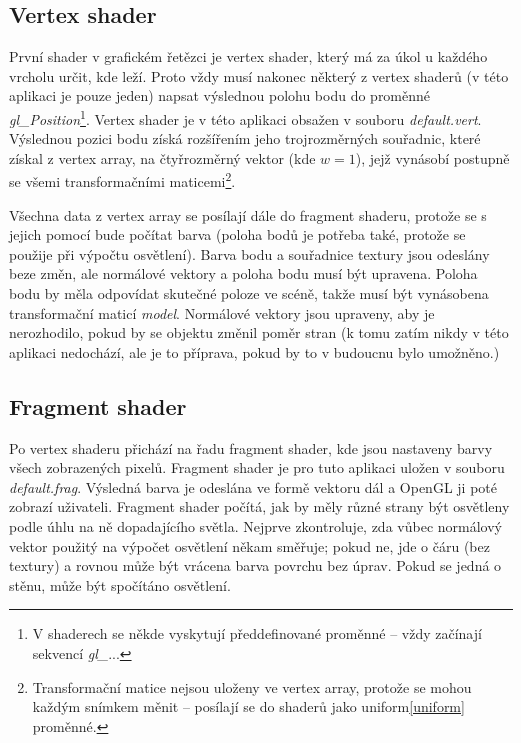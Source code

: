 \documentclass[a4paper, 11pt]{report}
\begin{document}
\subsection{Vertex shader}
První shader v grafickém řetězci je vertex shader, který má za úkol u každého vrcholu určit, kde leží. Proto vždy musí nakonec některý z vertex shaderů (v této aplikaci je pouze jeden) napsat výslednou polohu bodu do proměnné \emph{gl\_Position}\footnote{V shaderech se někde vyskytují předdefinované proměnné -- vždy začínají sekvencí \emph{gl\_}...}. Vertex shader je v této aplikaci obsažen v souboru \emph{default.vert}. Výslednou pozici bodu získá rozšířením jeho trojrozměrných souřadnic, které získal z vertex array, na čtyřrozměrný vektor (kde \(w=1\)), jejž vynásobí postupně se všemi transformačními maticemi\footnote{Transformační matice nejsou uloženy ve vertex array, protože se mohou každým snímkem měnit -- posílají se do shaderů jako uniform\cref{uniform} proměnné.}.

Všechna data z vertex array se posílají dále do fragment shaderu, protože se s jejich pomocí bude počítat barva (poloha bodů je potřeba také, protože se použije při výpočtu osvětlení). Barva bodu a souřadnice textury jsou odeslány beze změn, ale normálové vektory a poloha bodu musí být upravena. Poloha bodu by měla odpovídat skutečné poloze ve scéně, takže musí být vynásobena transformační maticí \emph{model}. Normálové vektory jsou upraveny, aby je nerozhodilo, pokud by se objektu změnil poměr stran (k tomu zatím nikdy v této aplikaci nedochází, ale je to příprava, pokud by to v budoucnu bylo umožněno.)

\subsection{Fragment shader}
Po vertex shaderu přichází na řadu fragment shader, kde jsou nastaveny barvy všech zobrazených pixelů. Fragment shader je pro tuto aplikaci uložen v souboru \emph{default.frag}. Výsledná barva je odeslána ve formě vektoru dál a OpenGL ji poté zobrazí uživateli. Fragment shader počítá, jak by měly různé strany být osvětleny podle úhlu na ně dopadajícího světla. Nejprve zkontroluje, zda vůbec normálový vektor použitý na výpočet osvětlení někam směřuje; pokud ne, jde o čáru (bez textury) a rovnou může být vrácena barva povrchu bez úprav. Pokud se jedná o stěnu, může být spočítáno osvětlení.
\end{document}
